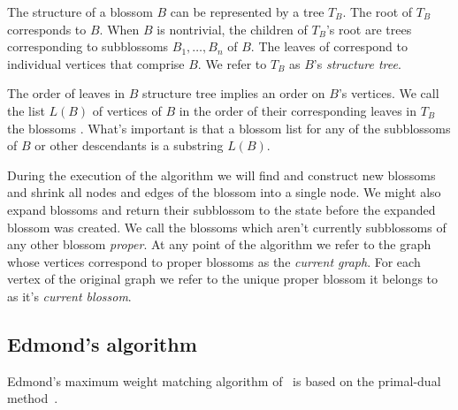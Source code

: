 The structure of a blossom $B$ can be represented by a tree $T_B$. The root of $T_B$ corresponds to $B$. When $B$ is nontrivial, the children of $T_B$'s root are trees corresponding to subblossoms $B_1, \dots, B_n$ of $B$. The leaves of correspond to individual vertices that comprise $B$. We refer to $T_B$ as $B$'s \textit{structure tree}.

The order of leaves in $B$ structure tree implies an order on $B$'s vertices. We call the list $L(B)$ of vertices of $B$ in the order of their corresponding leaves in $T_B$ the blossoms . What's important is that a blossom list for any of the subblossoms of $B$ or other descendants is a substring $L(B)$.

During the execution of the algorithm we will find and construct new blossoms and shrink all nodes and edges of the blossom into a single node. We might also expand blossoms and return their subblossom to the state before the expanded blossom was created. We call the blossoms which aren't currently subblossoms of any other blossom \textit{proper}. At any point of the algorithm we refer to the graph whose vertices correspond to proper blossoms as the \textit{current graph}. For each vertex of the original graph we refer to the unique proper blossom it belongs to  as it's \textit{current blossom}.

\subsection{Edmond's algorithm}

Edmond's maximum weight matching algorithm of~\cite{edmonds1965maximum} is based on the primal-dual method~\cite{lawler2001combinatorial}.

